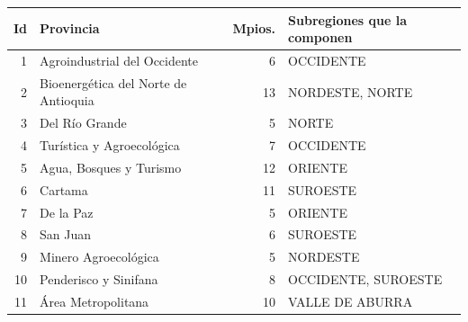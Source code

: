 \begin{tabularx}{\linewidth}{r>{\raggedright\arraybackslash}p{4.6cm}rX}
\toprule
\textbf{Id} & \textbf{Provincia} & \textbf{Mpios.} & \textbf{Subregiones que la componen} \\
\midrule
1 & Agroindustrial del Occidente & 6 & OCCIDENTE \\
2 & Bioenergética del Norte de Antioquia & 13 & NORDESTE, NORTE \\
3 & Del Río Grande & 5 & NORTE \\
4 & Turística y Agroecológica & 7 & OCCIDENTE \\
5 & Agua, Bosques y Turismo & 12 & ORIENTE \\
6 & Cartama & 11 & SUROESTE \\
7 & De la Paz & 5 & ORIENTE \\
8 & San Juan & 6 & SUROESTE \\
9 & Minero Agroecológica & 5 & NORDESTE \\
10 & Penderisco y Sinifana & 8 & OCCIDENTE, SUROESTE \\
11 & Área Metropolitana & 10 & VALLE DE ABURRA \\
\bottomrule
\end{tabularx}
